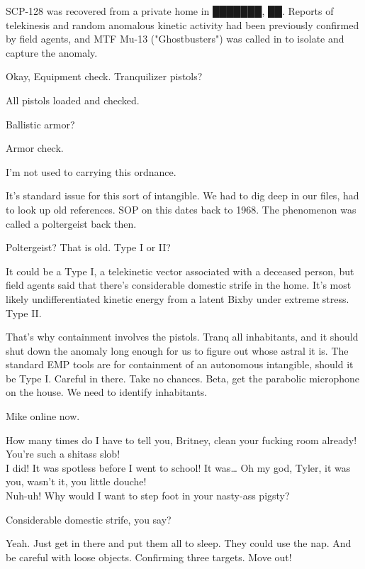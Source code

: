 
SCP-128 was recovered from a private home in ███████, ██. Reports of telekinesis and random anomalous kinetic activity had been previously confirmed by field agents, and MTF Mu-13 ("Ghostbusters") was called in to isolate and capture the anomaly.

\begin{scpbox}

 Okay, Equipment check. Tranquilizer pistols?

 All pistols loaded and checked.

 Ballistic armor?

 Armor check.

 I'm not used to carrying this ordnance.

 It's standard issue for this sort of intangible. We had to dig deep in our files, had to look up old references. SOP on this dates back to 1968. The phenomenon was called a poltergeist back then.

 Poltergeist? That is old. Type I or II?

 It could be a Type I, a telekinetic vector associated with a deceased person, but field agents said that there's considerable domestic strife in the home. It's most likely undifferentiated kinetic energy from a latent Bixby under extreme stress. Type II.

 That's why containment involves the pistols. Tranq all inhabitants, and it should shut down the anomaly long enough for us to figure out whose astral it is. The standard EMP tools are for containment of an autonomous intangible, should it be Type I. Careful in there. Take no chances. Beta, get the parabolic microphone on the house. We need to identify inhabitants.

 Mike online now.

 How many times do I have to tell you, Britney, clean your fucking room already! You're such a shitass slob!\\
 I did! It was spotless before I went to school! It was… Oh my god, Tyler, it was you, wasn't it, you little douche!\\
 Nuh-uh! Why would I want to step foot in your nasty-ass pigsty?

 Considerable domestic strife, you say?

 Yeah. Just get in there and put them all to sleep. They could use the nap. And be careful with loose objects. Confirming three targets. Move out!


\end{scpbox}
